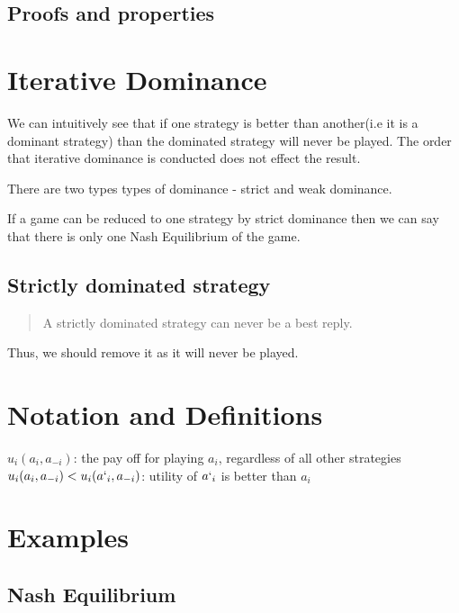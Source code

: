 \documentclass[11pt]{article}
\begin{document}
\subsection{Proofs and properties}

\section{Iterative Dominance}
We can intuitively see that if one strategy is better than another(i.e it is a dominant strategy) than the dominated strategy will never be played. The order that iterative dominance is conducted does not effect the result.

There are two types types of dominance - strict and weak dominance.

If a game can be reduced to one strategy by strict dominance then we can say that there is only one Nash Equilibrium of the game. 

\subsection*{Strictly dominated strategy}
\begin{quote}
A strictly dominated strategy can never be a best reply.
\end{quote}
Thus, we should remove it as it will never be played. 

\section{Notation and Definitions }
$u_{i}(a_{i}, a_{-i})$: the pay off for playing $a_{i}$, regardless of all other strategies \\
$u_{i}(a_{i}, a_{-i}) < u_{i}(a`_{i}, a_{-i})$: utility of $a`_{i}$ is better than $a_{i}$

\section{Examples}
\subsection{Nash Equilibrium}
\end{document}
